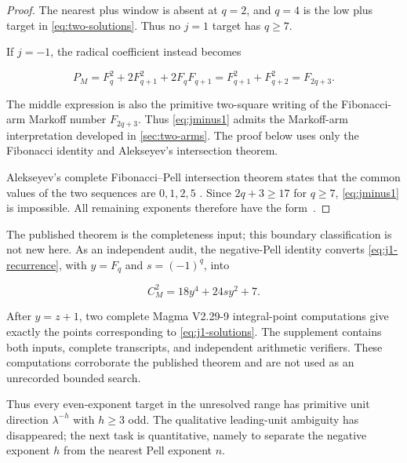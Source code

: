 \begin{proof}
The nearest plus window is absent at $q=2$, and $q=4$ is the low plus target
in \cref{eq:two-solutions}. Thus no $j=1$ target has $q\geqslant7$.

If $j=-1$, the radical coefficient instead becomes

\begin{equation}
 P_M=F_q^2+2F_{q+1}^2+2F_qF_{q+1}
 =F_{q+1}^2+F_{q+2}^2
 =F_{2q+3}.
 \label{eq:jminus1}
\end{equation}

The middle expression is also the primitive two-square writing of the
Fibonacci-arm Markoff number $F_{2q+3}$. Thus \cref{eq:jminus1} admits the
Markoff-arm interpretation developed in \cref{sec:two-arms}. The proof below
uses only the Fibonacci identity and Alekseyev's intersection theorem.

Alekseyev's complete Fibonacci--Pell intersection theorem states that the
common values of the two sequences are $0,1,2,5$ \cite[Theorem~9]{Alekseyev2011}.
Since $2q+3\geqslant17$ for $q\geqslant7$, \cref{eq:jminus1} is
impossible. All remaining exponents therefore have the form~.
\end{proof}

\begin{remark}
\label{rem:quartic-status}
The published theorem \cite{AlekseyevTengely2014} is the completeness input;
this boundary classification is not new here. As an independent audit, the
negative-Pell identity converts \cref{eq:j1-recurrence}, with
$y=F_q$ and $s=(-1)^q$, into

\begin{equation}
 C_M^2=18y^4+24sy^2+7.
\end{equation}

After $y=z+1$, two complete Magma V2.29-9 integral-point computations give
exactly the points corresponding to \cref{eq:j1-solutions}. The supplement
contains both inputs, complete transcripts, and independent arithmetic
verifiers. These computations corroborate the published theorem and are not
used as an unrecorded bounded search.
\end{remark}

Thus every even-exponent target in the unresolved range has primitive unit
direction $\lambda^{-h}$ with $h\geqslant3$ odd. The qualitative
leading-unit ambiguity has disappeared; the next task is quantitative,
namely to separate the negative exponent $h$ from the nearest Pell exponent
$n$.
